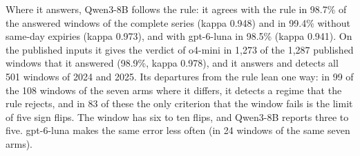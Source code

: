 Where it answers, Qwen3-8B follows the rule: it agrees with the rule in 98.7\% of the answered windows of the complete series (kappa 0.948) and in 99.4\% without same-day expiries (kappa 0.973), and with gpt-6-luna in 98.5\% (kappa 0.941). On the published inputs it gives the verdict of o4-mini in 1{,}273 of the 1{,}287 published windows that it answered (98.9\%, kappa 0.978), and it answers and detects all 501 windows of 2024 and 2025. Its departures from the rule lean one way: in 99 of the 108 windows of the seven arms where it differs, it detects a regime that the rule rejects, and in 83 of these the only criterion that the window fails is the limit of five sign flips. The window has six to ten flips, and Qwen3-8B reports three to five. gpt-6-luna makes the same error less often (in 24 windows of the same seven arms).

